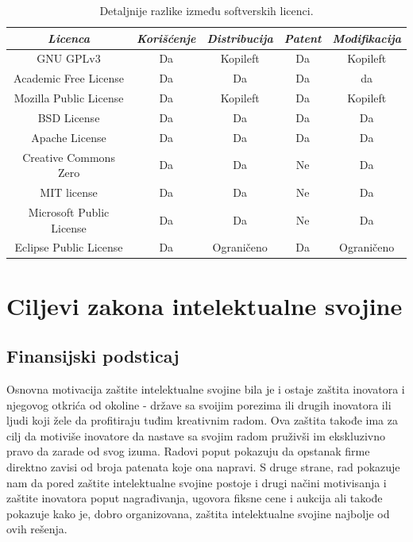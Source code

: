 \documentclass[a4paper]{article}
\begin{document}
\begin{table}[h!]
    \begin{center}
        \caption{ Detaljnije razlike između softverskih licenci. }
        \begin{tabular}{|c|c|c|c|c|} \hline
            \emph{Licenca} & \emph{Korišćenje} & \emph{Distribucija} & \emph{Patent} & \emph{Modifikacija} \\ \hline
            GNU GPLv3 & Da & Kopileft & Da & Kopileft\\ \hline
            Academic Free License & Da & Da & Da & da \\ \hline
            Mozilla Public License & Da & Kopileft & Da & Kopileft \\ \hline
            BSD License & Da & Da & Da & Da \\ \hline
            Apache License & Da & Da & Da & Da  \\ \hline
            Creative Commons Zero & Da & Da & Ne & Da \\ \hline
            MIT license & Da & Da & Ne & Da \\ \hline
            Microsoft Public License & Da & Da & Ne & Da \\ \hline
            Eclipse Public License & Da & Ograničeno & Da & Ograničeno \\ \hline
        \end{tabular}
        \label{tab:tabela1}
    \end{center}
\end{table}

\section{Ciljevi zakona intelektualne svojine}

\subsection{Finansijski podsticaj}
\label{subsec:fin}

Osnovna motivacija zaštite intelektualne svojine bila je i ostaje zaštita inovatora
i njegovog otkrića od okoline - države sa svoijim porezima ili drugih
inovatora ili ljudi koji žele da profitiraju tuđim kreativnim radom.
Ova zaštita takođe ima za cilj da motiviše inovatore da nastave sa svojim
radom pruživši im ekskluzivno pravo da zarade od svog izuma. Radovi poput \cite{patents} 
pokazuju da opstanak firme direktno zavisi od broja patenata koje ona napravi.
S druge strane, rad \cite{patents} pokazuje nam da pored zaštite intelektualne svojine 
postoje i drugi načini motivisanja i zaštite inovatora poput nagrađivanja, 
ugovora fiksne cene i aukcija ali takođe pokazuje kako je, dobro
organizovana, zaštita intelektualne svojine najbolje od ovih rešenja.
\end{document}
